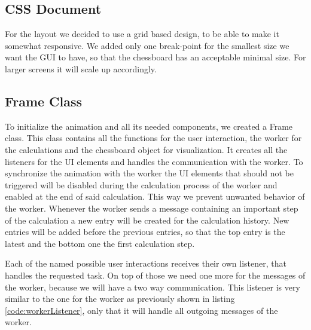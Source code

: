\subsection{CSS Document}
\label{sub:impCSS}
For the layout we decided to use a grid based design, to be able to make it somewhat responsive. We added only one break-point for the smallest size we want the GUI to have, so that the chessboard has an acceptable minimal size. For larger screens it will scale up accordingly.

\subsection{Frame Class}
\label{sub:impFrame}
To initialize the animation and all its needed components, we created a Frame class. This class contains all the functions for the user interaction, the worker for the calculations and the chessboard object for visualization. It creates all the listeners for the UI elements and handles the communication with the worker. To synchronize the animation with the worker the UI elements that should not be triggered will be disabled during the calculation process of the worker and enabled at the end of said calculation. This way we prevent unwanted behavior of the worker. Whenever the worker sends a message containing an important step of the calculation a new entry will be created for the calculation history. New entries will be added before the previous entries, so that the top entry is the latest and the bottom one the first calculation step.

Each of the named possible user interactions receives their own listener, that handles the requested task. On top of those we need one more for the messages of the worker, because we will have a two way communication. This listener is very similar to the one for the worker as previously shown in listing \ref{code:workerListener}, only that it will handle all outgoing messages of the worker.